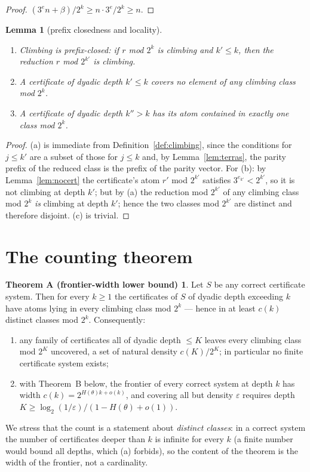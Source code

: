 \documentclass[11pt]{article}
\newtheorem{lemma}[theorem]{Lemma}
\theoremstyle{definition}
\newtheorem*{thmA}{Theorem A (frontier-width lower bound)}
\begin{document}
\begin{proof}
$(3^e n+\beta)/2^k \ge n\cdot 3^e/2^k \ge n$.
\end{proof}

\begin{lemma}[prefix closedness and locality]\label{lem:locality}
\begin{enumerate}
\item[(a)] Climbing is prefix-closed: if $r$ mod $2^k$ is climbing and
  $k'\le k$, then the reduction $r$ mod $2^{k'}$ is climbing.
\item[(b)] A certificate of dyadic depth $k'\le k$ covers no element of any
  climbing class mod $2^k$.
\item[(c)] A certificate of dyadic depth $k''>k$ has its atom contained in
  exactly one class mod $2^k$.
\end{enumerate}
\end{lemma}

\begin{proof}
(a) is immediate from Definition~\ref{def:climbing}, since the conditions
for $j\le k'$ are a subset of those for $j\le k$ and, by
Lemma~\ref{lem:terras}, the parity prefix of the reduced class is the
prefix of the parity vector. For (b): by Lemma~\ref{lem:nocert} the
certificate's atom $r'$ mod $2^{k'}$ satisfies $3^{e_{k'}}<2^{k'}$, so it is
not climbing at depth $k'$; but by (a) the reduction mod $2^{k'}$ of any
climbing class mod $2^k$ \emph{is} climbing at depth $k'$; hence the two
classes mod $2^{k'}$ are distinct and therefore disjoint. (c) is trivial.
\end{proof}

\section{The counting theorem}\label{sec:counting}

\begin{thmA}
Let $S$ be any correct certificate system. Then for every $k\ge 1$ the
certificates of $S$ of dyadic depth exceeding $k$ have atoms lying in
every climbing class mod $2^k$ --- hence in at least $c(k)$ distinct
classes mod $2^k$. Consequently:
\begin{enumerate}
\item[(a)] any family of certificates all of dyadic depth $\le K$ leaves
  every climbing class mod $2^K$ uncovered, a set of natural density
  $c(K)/2^K$; in particular no finite certificate system exists;
\item[(b)] with Theorem~B below, the frontier of every correct system at
  depth $k$ has width $c(k)=2^{H(\theta)k+o(k)}$, and covering all but
  density $\varepsilon$ requires depth
  $K\ge \log_2(1/\varepsilon)/(1-H(\theta)+o(1))$.
\end{enumerate}
We stress that the count is a statement about \emph{distinct classes}:
in a correct system the number of certificates deeper than $k$ is
infinite for every $k$ (a finite number would bound all depths, which
(a) forbids), so the content of the theorem is the width of the frontier,
not a cardinality.
\end{thmA}
\end{document}
